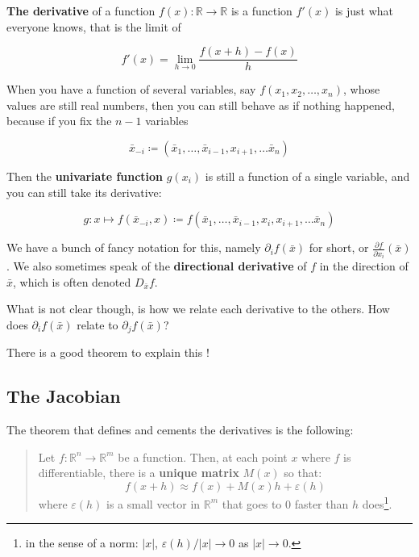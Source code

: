 \documentclass[
  letterpaper,
  DIV=11,
  numbers=noendperiod]{scrreprt}
\begin{document}
\textbf{The derivative} of a function
\(f(x)\colon \mathbb{R}\to\mathbb{R}\) is a function \(f'(x)\) is just
what everyone knows, that is the limit of

\[f'(x) = \lim_{h\to 0} \frac{f(x+h) - f(x)}{h}\]

When you have a function of several variables, say
\(f(x_1, x_2, \dots, x_n)\), whose values are still real numbers, then
you can still behave as if nothing happened, because if you fix the
\(n-1\) variables

\[\bar{x}_{\scriptscriptstyle-i} \coloneqq (\bar{x}_1,\ldots,\bar{x}_{\scriptscriptstyle i-1},x_{\scriptscriptstyle i+1},\dots\bar{x}_n)\]

Then the \textbf{univariate function} \(g(x_i)\) is still a function of
a single variable, and you can still take its derivative:

\[ g\colon x \mapsto f(\bar{x}_{\scriptscriptstyle-i}, x) \coloneqq f(\bar{x}_1,\ldots,\bar{x}_{\scriptscriptstyle i-1},x_i, x_{\scriptscriptstyle i+1},\dots\bar{x}_n)\]

We have a bunch of fancy notation for this, namely
\(\partial_i f(\bar{x})\) for short, or
\(\frac{\partial f}{\partial x_i}(\bar{x})\). We also sometimes speak of
the \textbf{directional derivative} of \(f\) in the direction of
\(\bar{x}\), which is often denoted \(D_{\bar{x}}f\).

What is not clear though, is how we relate each derivative to the
others. How does \(\partial_i f(\bar{x})\) relate to
\(\partial_j f(\bar{x})\)?

There is a good theorem to explain this !

\hypertarget{the-jacobian}{%
\subsection{The Jacobian}\label{the-jacobian}}

The theorem that defines and cements the derivatives is the following:

\begin{quote}
Let \(f\colon \mathbb{R}^n \to \mathbb{R}^m\) be a function. Then, at
each point \(x\) where \(f\) is differentiable, there is a
\textbf{unique matrix} \(M(x)\) so that:
\[ f(x+h) \approx f(x) + M(x)h +\varepsilon (h)\] where
\(\varepsilon (h)\) is a small vector in \(\mathbb{R}^m\) that goes to
\(0\) faster than \(h\) does\footnote{in the sense of a norm:
  \(\lvert x\rvert\), \(\varepsilon(h)/\lvert x\rvert\to 0\) as
  \(\lvert x\rvert\to 0\).}.
\end{quote}
\end{document}
